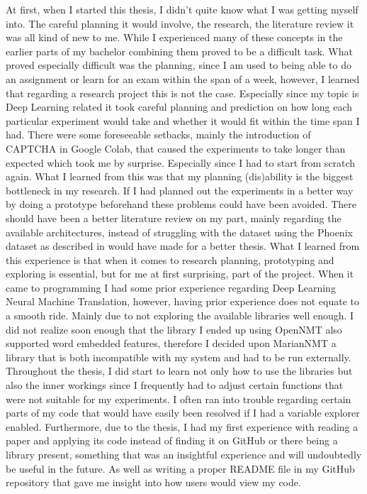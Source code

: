 At first, when I started this thesis, I didn't quite know what I was getting myself into. The careful planning it would involve, the research, the literature review it was all kind of new to me. While I experienced many of these concepts in the earlier parts of my bachelor combining them proved to be a difficult task. What proved especially difficult was the planning, since I am used to being able to do an assignment or learn for an exam within the span of a week, however, I learned that regarding a research project this is not the case. Especially since my topic is Deep Learning related it took careful planning and prediction on how long each particular experiment would take and whether it would fit within the time span I had. There were some foreseeable setbacks, mainly the introduction of CAPTCHA in Google Colab, that caused the experiments to take longer than expected which took me by surprise. Especially since I had to start from scratch again. What I learned from this was that my planning (dis)ability is the biggest bottleneck in my research. If I had planned out the experiments in a better way by doing a prototype beforehand these problems could have been avoided. There should have been a better literature review on my part, mainly regarding the available architectures, instead of struggling with the dataset using the Phoenix dataset as described in \cite{camgoz2018neural} would have made for a better thesis. What I learned from this experience is that when it comes to research planning, prototyping and exploring is essential, but for me at first surprising, part of the project.
When it came to programming I had some prior experience regarding Deep Learning Neural Machine Translation, however, having prior experience does not equate to a smooth ride. Mainly due to not exploring the available libraries well enough. I did not realize soon enough that the library I ended up using OpenNMT \cite{klein-etal-2017-opennmt} also supported word embedded features, therefore I decided upon MarianNMT \cite{mariannmt} a library that is both incompatible with my system and had to be run externally. Throughout the thesis, I did start to learn not only how to use the libraries but also the inner workings since I frequently had to adjust certain functions that were not suitable for my experiments. I often ran into trouble regarding certain parts of my code that would have easily been resolved if I had a variable explorer enabled. Furthermore, due to the thesis, I had my first experience with reading a paper and applying its code instead of finding it on GitHub or there being a library present, something that was an insightful experience and will undoubtedly be useful in the future. As well as writing a proper README file in my GitHub repository \cite{gijsgithub} that gave me insight into how users would view my code.
